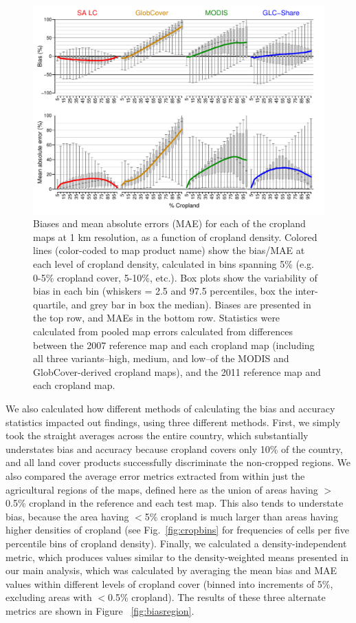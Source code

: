 \documentclass[12pt, titlepage]{article}
\begin{document}
\begin{figure}[!ht]
  \centering
     \includegraphics[width = 14cm]{figures/biases_1km.pdf} 
      \caption{Biases and mean absolute errors (MAE) for each of the cropland maps at 1 km resolution, as a function of cropland density. Colored lines (color-coded to map product name) show the bias/MAE at each level of cropland density, calculated in bins spanning 5\% (e.g. 0-5\% cropland cover, 5-10\%, etc.). Box plots show the variability of bias in each bin (whiskers = 2.5 and 97.5 percentiles, box the inter-quartile, and grey bar in box the median). Biases are presented in the top row, and MAEs in the bottom row. Statistics were calculated from pooled map errors calculated from differences between the 2007 reference map and each cropland map (including all three variants--high, medium, and low--of the MODIS and GlobCover-derived cropland maps), and the 2011 reference map and each cropland map. }
      \label{fig:biases1km}
\end{figure}

We also calculated how different methods of calculating the bias and accuracy statistics impacted out findings, using three different methods. First, we simply took the straight averages across the entire country, which substantially understates bias and accuracy because cropland covers only 10\% of the country, and all land cover products successfully discriminate the non-cropped regions.  We also compared the average error metrics extracted from within just the agricultural regions of the maps, defined here as the union of areas having $>$0.5\% cropland in the reference and each test map. This also tends to understate bias, because the area having $<$5\% cropland is much larger than areas having higher densities of cropland (see Fig.~\ref{fig:cropbins} for frequencies of cells per five percentile bins of cropland density). Finally, we calculated a density-independent metric, which produces values similar to the density-weighted means presented in our main analysis, which was calculated by averaging the mean bias and MAE values within different levels of cropland cover (binned into increments of 5\%, excluding areas with $<$0.5\% cropland). The results of these three alternate metrics are shown in Figure ~\ref{fig:biasregion}. 
\end{document}
